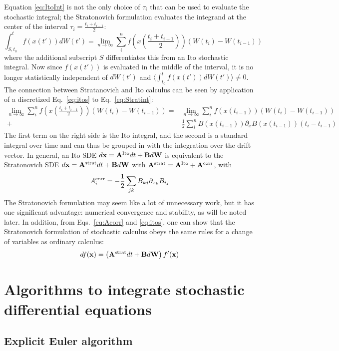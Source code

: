 \documentclass[notitlepage,pra,10pt,aps]{revtex4-2}
\newcommand {\be}{\begin{equation}}
\newcommand {\ee}{\end{equation}}
\newcommand{\expect}[1]{\langle#1\rangle}
\begin{document}
Equation \eqref{eq:ItoInt} is not the only choice of $\tau_i$ that can be used to evaluate the stochastic integral; the Stratonovich formulation evaluates the integrand at the center of the interval $\tau_i=\frac{t_i+t_{i-1}}{2}$:
\be
\int_{S,t_0}^t f(x(t'))dW(t')=\lim_{n\to\infty} \sum_i^n f(x(\frac{t_i+t_{i-1}}{2}))\left(W(t_i)-W(t_{i-1})\right) \label{eq:Stratint}
\ee
where the additional subscript $S$ differentiates this from an Ito stochastic integral. Now since $f(x(t'))$  is evaluated in the middle of the interval, it is no longer statistically independent of  $dW(t')$ and $\expect{\int_{t_0}^t f(x(t'))dW(t')}\neq0$. The connection between Stratanovich and Ito calculus can be seen by application of a discretized Eq.~\eqref{eq:itos} to Eq.~\eqref{eq:Stratint}:
\begin{align}
\lim_{n\to\infty} \sum_i^n f(x(\frac{t_i+t_{i-1}}{2}))\left(W(t_i)-W(t_{i-1})\right)=& \lim_{n\to\infty} \sum_i^n f(x(t_{i-1}))\left(W(t_i)-W(t_{i-1})\right) \nonumber \\
+&\frac{1}{2}\sum_i^n B(x(t_{i-1}))\partial_x B(x(t_{i-1}))(t_i-t_{i-1})\nonumber
\end{align}
The first term on the right side is the Ito integral, and the second is a standard integral over time and can thus be  grouped in with the integration over the drift vector.  In general, an Ito SDE $d\mathbf{x}=\mathbf{A}^{\rm Ito}dt+\mathbf{B}d\mathbf{W}$ is equivalent to the Stratonovich SDE $d\mathbf{x}=\mathbf{A}^{\rm strat}dt+\mathbf{B}d\mathbf{W}$ with $\mathbf{A}^{\rm strat}=\mathbf{A}^{\rm Ito}+\mathbf{A}^{\rm corr}$, with
\be
{A}^{\rm corr}_i=-\frac{1}{2}\sum_{jk}B_{kj}\partial_{x_k}B_{ij}
\label{eq:Acorr}
\ee
 The Stratonovich formulation may seem like a lot of unnecessary work, but it has one significant advantage: numerical convergence and stability, as will be noted later.  In addition, from Eqs.~\eqref{eq:Acorr} and \eqref{eq:itos}, one can show that the Stratonovich formulation of stochastic calculus obeys the same rules for a change of variables as ordinary calculus:
\be
df(\mathbf{x})=\left(\mathbf{A}^{\rm strat}dt+\mathbf{B}d\mathbf{W}\right)f'(\mathbf{x})
\ee


\section{Algorithms to integrate stochastic differential equations}

\subsection{Explicit Euler algorithm}
\end{document}
